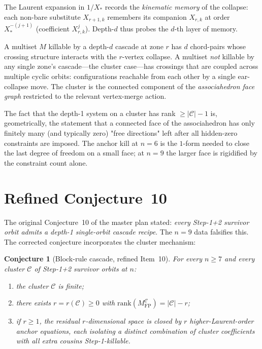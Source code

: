 \documentclass[11pt]{article}
\newtheorem{conj}[thm]{Conjecture}
\theoremstyle{definition}
\begin{document}
The Laurent expansion in $1/X_*$ records the \emph{kinematic memory}
of the collapse: each non-bare substitute $X_{r+1,k}$ remembers its
companion $X_{r,k}$ at order $X_*^{-(j+1)}$ (coefficient
$X_{r,k}^{j}$). Depth-$d$ thus probes the $d$-th layer of memory.

A multiset $M$ killable by a depth-$d$ cascade at zone $r$ has
$d$ chord-pairs whose crossing structure interacts with the
$r$-vertex collapse. A multiset \emph{not} killable by any single
zone's cascade---the cluster case---has crossings that are coupled
across multiple cyclic orbits: configurations reachable from each
other by a single ear-collapse move. The cluster is the connected
component of the \emph{associahedron face graph} restricted to the
relevant vertex-merge action.

The fact that the depth-1 system on a cluster has rank
$\ge|\mathcal C|-1$ is, geometrically, the statement that a
connected face of the associahedron has only finitely many (and
typically zero) "free directions" left after all hidden-zero
constraints are imposed. The anchor kill at $n=6$ is the $1$-form
needed to close the last degree of freedom on a small face; at
$n=9$ the larger face is rigidified by the constraint count alone.

\section{Refined Conjecture~10}\label{sec:conj}

The original Conjecture~10 of the master plan stated:
\emph{every Step-1+2 survivor orbit admits a depth-1 single-orbit
cascade recipe}. The $n=9$ data falsifies this. The corrected
conjecture incorporates the cluster mechanism:

\begin{conj}[Block-rule cascade, refined Item~10]\label{conj:item10}
For every $n\ge 7$ and every cluster $\mathcal C$ of Step-1+2
survivor orbits at $n$:
\begin{enumerate}[label=\textup{(\arabic*)}]
\item the cluster $\mathcal C$ is finite;
\item there exists $r=r(\mathcal C)\ge 0$ with
$\mathrm{rank}(M_{\mathrm{FP}}^{\mathcal C})=|\mathcal C|-r$;
\item if $r\ge 1$, the residual $r$-dimensional space is closed
by $r$ higher-Laurent-order anchor equations, each isolating a
distinct combination of cluster coefficients with all extra cousins
Step-1-killable.
\end{enumerate}
\end{conj}
\end{document}
